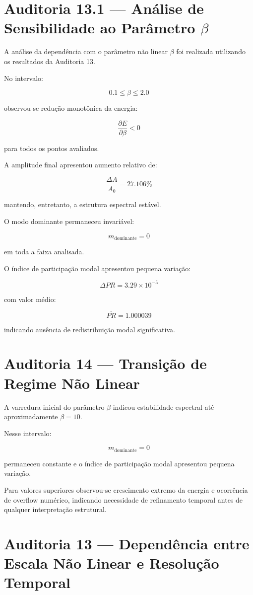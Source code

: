 \documentclass[11pt,a4paper]{article}
\begin{document}
\section{Auditoria 13.1 — Análise de Sensibilidade ao Parâmetro $\beta$}

A análise da dependência com o parâmetro não linear
$\beta$ foi realizada utilizando os resultados da Auditoria 13.

No intervalo:

\[
0.1 \leq \beta \leq 2.0
\]

observou-se redução monotônica da energia:

\[
\frac{\partial E}{\partial\beta}<0
\]

para todos os pontos avaliados.

A amplitude final apresentou aumento relativo de:

\[
\frac{\Delta A}{A_0}=27.106\%
\]

mantendo, entretanto, a estrutura espectral estável.

O modo dominante permaneceu invariável:

\[
m_{\mathrm{dominante}}=0
\]

em toda a faixa analisada.

O índice de participação modal apresentou pequena variação:

\[
\Delta PR =
3.29\times10^{-5}
\]

com valor médio:

\[
\overline{PR}=1.000039
\]

indicando ausência de redistribuição modal significativa.
\section{Auditoria 14 — Transição de Regime Não Linear}

A varredura inicial do parâmetro $\beta$ indicou
estabilidade espectral até aproximadamente
$\beta=10$.

Nesse intervalo:

\[
m_{\mathrm{dominante}}=0
\]

permaneceu constante e o índice de participação modal
apresentou pequena variação.

Para valores superiores observou-se crescimento extremo
da energia e ocorrência de overflow numérico, indicando
necessidade de refinamento temporal antes de qualquer
interpretação estrutural.
\section{Auditoria 13 — Dependência entre Escala Não Linear e Resolução Temporal}
\end{document}
